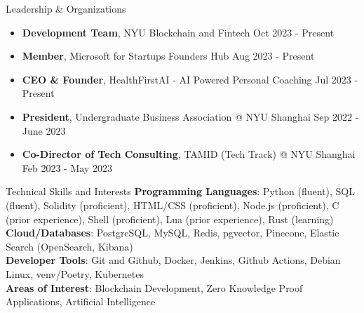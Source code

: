 \documentclass{resume} %
\begin{document}

\begin{rSection}{Leadership \& Organizations}
	\begin{itemize}
		\item \textbf{Development Team}{, NYU Blockchain and Fintech} \hfill Oct 2023 - Present
		\item \textbf{Member}{, Microsoft for Startups Founders Hub} \hfill Aug 2023 - Present
		\item \textbf{CEO \& Founder}{, HealthFirstAI - AI Powered Personal Coaching} \hfill Jul 2023 - Present
		\item \textbf{President}{, Undergraduate Business Association @ NYU Shanghai} \hfill Sep 2022 - June 2023
		\item \textbf{Co-Director of Tech Consulting}{, TAMID (Tech Track) @ NYU Shanghai} \hfill Feb 2023 - May 2023
	\end{itemize}
\end{rSection}


\begin{rSection}{Technical Skills and Interests}
	\textbf{Programming Languages}{: Python (fluent), SQL (fluent), Solidity (proficient), HTML/CSS (proficient), Node.js (proficient), C (prior experience),  Shell  (proficient), Lua (prior experience), Rust (learning)} \\
	\textbf{Cloud/Databases}{: PostgreSQL, MySQL, Redis, pgvector, Pinecone, Elastic Search (OpenSearch, Kibana)} \\
	\textbf{Developer Tools}{: Git and Github, Docker, Jenkins, Github Actions, Debian Linux, venv/Poetry, Kubernetes} \\
	\textbf{Areas of Interest}{: Blockchain Development, Zero Knowledge Proof Applications, Artificial Intelligence}
\end{rSection}
\end{document}
